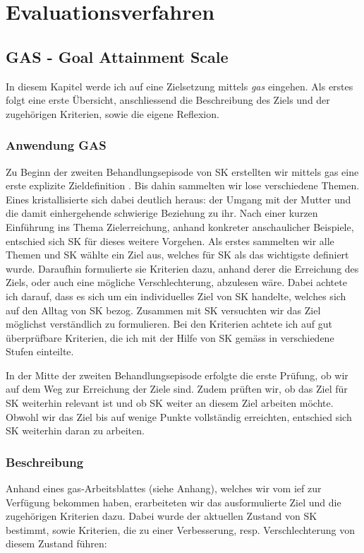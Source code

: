 \section{Evaluations\-verfahren}\label{sec:Evaluationsverfahren}

\subsection{GAS - Goal Attainment Scale}
In diesem Kapitel werde ich auf eine Zielsetzung mittels \textit{\acf{gas}} eingehen. Als erstes folgt eine erste Übersicht, anschliessend die Beschreibung des Ziels und der zugehörigen Kriterien, sowie die eigene Reflexion.

\subsubsection{Anwendung GAS}
Zu Beginn der zweiten Behandlungsepisode von SK erstellten wir mittels \ac{gas}  eine erste explizite Zieldefinition \cite{Kiresuk1968}. Bis dahin sammelten wir lose verschiedene Themen. Eines kristallisierte sich dabei deutlich heraus: der Umgang mit der Mutter und die damit einhergehende schwierige Beziehung zu ihr. Nach einer kurzen Einführung ins Thema Zielerreichung, anhand konkreter anschaulicher Beispiele, entschied sich SK für dieses weitere Vorgehen. Als erstes sammelten wir alle Themen und SK wählte ein Ziel aus, welches für SK als das wichtigste definiert wurde. Daraufhin formulierte sie Kriterien dazu, anhand derer die Erreichung des Ziels, oder auch eine mögliche Verschlechterung, abzulesen wäre. Dabei achtete ich darauf, dass es sich um ein individuelles Ziel von SK handelte, welches sich auf den Alltag von SK bezog. Zusammen mit SK versuchten wir das Ziel möglichst verständlich zu formulieren. Bei den Kriterien achtete ich auf gut überprüfbare Kriterien, die ich mit der Hilfe von SK gemäss  in verschiedene Stufen einteilte. 

In der Mitte der zweiten Behandlungsepisode erfolgte die erste Prüfung, ob wir auf dem Weg zur Erreichung der Ziele sind. Zudem prüften wir, ob das Ziel für SK weiterhin relevant ist und ob SK weiter an diesem Ziel arbeiten möchte. Obwohl wir das Ziel bis auf wenige Punkte vollständig erreichten, entschied sich SK weiterhin daran zu arbeiten. 

\subsubsection{Beschreibung}
Anhand eines \ac{gas}-Arbeitsblattes (siehe Anhang), welches wir vom \ac{ief} zur Verfügung bekommen haben, erarbeiteten wir das ausformulierte Ziel und die zugehörigen Kriterien dazu. Dabei wurde der aktuellen Zustand von SK bestimmt, sowie Kriterien, die zu einer Verbesserung, resp. Verschlechterung von diesem Zustand führen:

